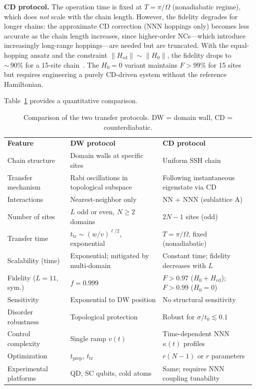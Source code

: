 \documentclass[
  reprint,
  amsmath,
  amssymb,
  aps,
  prb,
  longbibliography,
]{revtex4-2}
\newcommand{\ttr}{t_{\mathrm{tr}}}
\newcommand{\tprep}{t_{\mathrm{prep}}}
\begin{document}
\textbf{CD protocol.}
The operation time is fixed at $T = \pi/\Omega$ (nonadiabatic regime), which
does \emph{not} scale with the chain length. However, the fidelity degrades
for longer chains: the approximate CD correction (NNN hoppings only)
becomes less accurate as the chain length increases, since higher-order NCs---which
introduce increasingly long-range hoppings---are needed but are truncated.
With the equal-hopping ansatz and the constraint
$\|H_{\mathrm{cd}}\| \sim \|H_0\|$, the fidelity drops to ${\sim}\,90\%$
for a 15-site chain~\cite{Romero2024}. The $H_0 = 0$ variant maintains
$F > 99\%$ for 15 sites but requires engineering a purely CD-driven
system without the reference Hamiltonian.

Table~\ref{tab:comparison} provides a quantitative comparison.

\begin{table}[t]
  \caption{Comparison of the two transfer protocols. DW = domain wall,
  CD = counterdiabatic.}
  \label{tab:comparison}
  \begin{ruledtabular}
  \begin{tabular}{lll}
    \textbf{Feature} & \textbf{DW protocol}~\cite{Zurita2023}
    & \textbf{CD protocol}~\cite{Romero2024} \\
    \colrule
    Chain structure & Domain walls at specific sites &
    Uniform SSH chain \\
    Transfer mechanism & Rabi oscillations in topological subspace &
    Following instantaneous eigenstate via CD \\
    Interactions & Nearest-neighbor only &
    NN + NNN (sublattice A) \\
    Number of sites & $L$ odd or even, $N \geq 2$ domains &
    $2N - 1$ sites (odd) \\
    Transfer time & $\ttr \sim (w/v)^{\ell/2}$, exponential &
    $T = \pi/\Omega$, fixed (nonadiabatic) \\
    Scalability (time) & Exponential; mitigated by multi-domain &
    Constant time; fidelity decreases with $L$ \\
    Fidelity ($L = 11$, sym.) & $f = 0.999$ &
    $F > 0.97$ ($H_0{+}H_{\mathrm{cd}}$); $F{>}0.99$ ($H_0{=}0$) \\
    Sensitivity & Exponential to DW position &
    No structural sensitivity \\
    Disorder robustness & Topological protection &
    Robust for $\sigma/t_0 \lesssim 0.1$ \\
    Control complexity & Single ramp $v(t)$ &
    Time-dependent NNN $\kappa(t)$ profiles \\
    Optimization & $\tprep$, $\ttr$ & $r(N{-}1)$ or $r$ parameters \\
    Experimental platforms & QD, SC qubits, cold atoms &
    Same; requires NNN coupling tunability \\
  \end{tabular}
  \end{ruledtabular}
\end{table}
\end{document}
